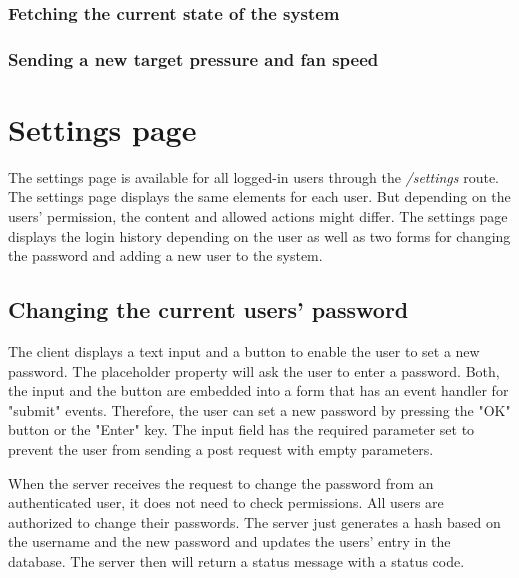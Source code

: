 \subsubsection{Fetching the current state of the system}
\label{subsec:fetching_the_current_state_of_the_system}


\subsubsection{Sending a new target pressure and fan speed}
\label{subsec:sending_a_new_target_pressure_and_fan_speed}





\section{Settings page}
\label{sec:settings_page}

The settings page is available for all logged-in users through the \textit{/settings} route. The settings page displays the same elements for each user. But depending on the users' permission, the content and allowed actions might differ. The settings page displays the login history depending on the user as well as two forms for changing the password and adding a new user to the system.



\subsection{Changing the current users' password}
\label{subsec:changing_the_current_users_password}

The client displays a text input and a button to enable the user to set a new password. The placeholder property will ask the user to enter a password. Both, the input and the button are embedded into a form that has an event handler for "submit" events. Therefore, the user can set a new password by pressing the "OK" button or the "Enter" key.  The input field has the required parameter set to prevent the user from sending a post request with empty parameters.

When the server receives the request to change the password from an authenticated user, it does not need to check permissions. All users are authorized to change their passwords. The server just generates a hash based on the username and the new password and updates the users' entry in the database. The server then will return a status message with a status code.

